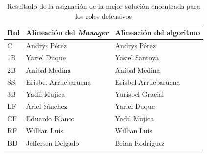 \begin{table}[H]
	\centering
	\caption{Resultado de la asignación de la mejor solución encontrada para los roles defensivos}\label{table:asignacion-pelota-def}
	\begin{tabular}{l l l }
		\toprule
		\textbf{Rol}         & \textbf{Alineación del \textit{Manager}} & \textbf{Alineación del algoritmo} \\ \midrule
		\rowcolor{gray!30} C & Andrys Pérez                             & Andrys Pérez                      \\
		1B                   & Yariel Duque                             & Yasiel Santoya                    \\
		\rowcolor{gray!30}2B & Aníbal Medina                            & Aníbal Medina                     \\
		\rowcolor{gray!30}SS & Erisbel Arruebaruena                     & Erisbel Arruebaruena              \\
		3B                   & Yadil Mujica                             & Yurisbel Gracial                  \\
		LF                   & Ariel Sánchez                            & Yariel Duque                      \\
		CF                   & Eduardo Blanco                           & Yadil Mujica                      \\
		\rowcolor{gray!30}RF & Willian Luis                             & Willian Luis                      \\
		BD                   & Jefferson Delgado                        & Brian Rodríguez                   \\ \bottomrule
	\end{tabular}
\end{table}

